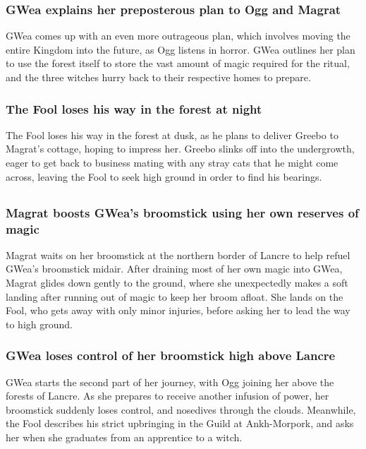 \subsubsection{\Gls{GWea} explains her preposterous plan to \Gls{Ogg} and \Gls{Magrat}}
\Gls{GWea} comes up with an even more outrageous plan, which involves moving the entire Kingdom
into the future, as \Gls{Ogg} listens in horror. \Gls{GWea} outlines her plan to use the forest
itself to store the vast amount of magic required for the ritual, and the three witches hurry back
to their respective homes to prepare.

\subsubsection{The \Gls{Fool} loses his way in the forest at night}
The \Gls{Fool} loses his way in the forest at dusk, as he plans to deliver \Gls{Greebo} to
\Gls{Magrat}'s cottage, hoping to impress her. \Gls{Greebo} slinks off into the undergrowth, eager
to get back to business mating with any stray cats that he might come across, leaving the \Gls{Fool}
to seek high ground in order to find his bearings.

\subsection{}
\subsubsection{\Gls{Magrat} boosts \Gls{GWea}'s broomstick using her own reserves of magic}
\Gls{Magrat} waits on her broomstick at the northern border of Lancre to help refuel \Gls{GWea}'s
broomstick midair. After draining most of her own magic into \Gls{GWea}, \Gls{Magrat} glides down
gently to the ground, where she unexpectedly makes a soft landing after running out of magic to keep
her broom afloat. She lands on the \Gls{Fool}, who gets away with only minor injuries, before asking
her to lead the way to high ground.

\subsubsection{\Gls{GWea} loses control of her broomstick high above Lancre}
\Gls{GWea} starts the second part of her journey, with \Gls{Ogg} joining her above the forests of
Lancre. As she prepares to receive another infusion of power, her broomstick suddenly loses control,
and nosedives through the clouds. Meanwhile, the \Gls{Fool} describes his strict upbringing in the
Guild at Ankh-Morpork, and asks her when she graduates from an apprentice to a witch.


